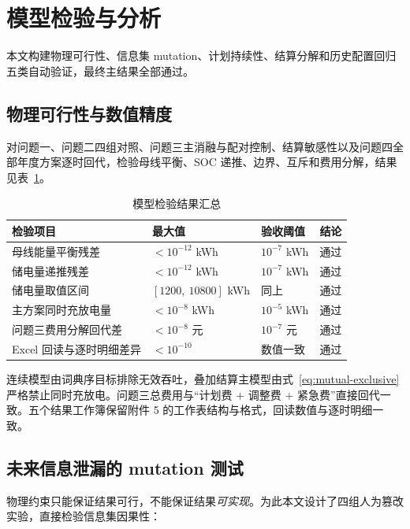 \section{模型检验与分析}
\label{sec:validation}

本文构建物理可行性、信息集 mutation、计划持续性、结算分解和历史配置回归五类自动验证，最终主结果全部通过。

\subsection{物理可行性与数值精度}

对问题一、问题二四组对照、问题三主消融与配对控制、结算敏感性以及问题四全部年度方案逐时回代，检验母线平衡、SOC 递推、边界、互斥和费用分解，结果见表~\ref{tab:validation}。

\begin{table}[htbp]
	\caption{模型检验结果汇总}
	\label{tab:validation}
	\centering
	\begin{tabular}{l l l l}
		\toprule
		检验项目 & 最大值 & 验收阈值 & 结论 \\
		\midrule
		母线能量平衡残差 & $<10^{-12}$ kWh & $10^{-7}$ kWh & 通过 \\
		储电量递推残差 & $<10^{-12}$ kWh & $10^{-7}$ kWh & 通过 \\
		储电量取值区间 & $[1200,\ 10800]$ kWh & 同上 & 通过 \\
		主方案同时充放电量 & $<10^{-8}$ kWh & $10^{-5}$ kWh & 通过 \\
		问题三费用分解回代差 & $<10^{-8}$ 元 & $10^{-7}$ 元 & 通过 \\
		Excel 回读与逐时明细差异 & $<10^{-10}$ & 数值一致 & 通过 \\
		\bottomrule
	\end{tabular}
\end{table}

连续模型由词典序目标排除无效吞吐，叠加结算主模型由式~\eqref{eq:mutual-exclusive} 严格禁止同时充放电。问题三总费用与“计划费 $+$ 调整费 $+$ 紧急费”直接回代一致。五个结果工作簿保留附件 5 的工作表结构与格式，回读数值与逐时明细一致。

\subsection{未来信息泄漏的 mutation 测试}

物理约束只能保证结果可行，不能保证结果\emph{可实现}。为此本文设计了四组人为篡改实验，直接检验信息集因果性：

